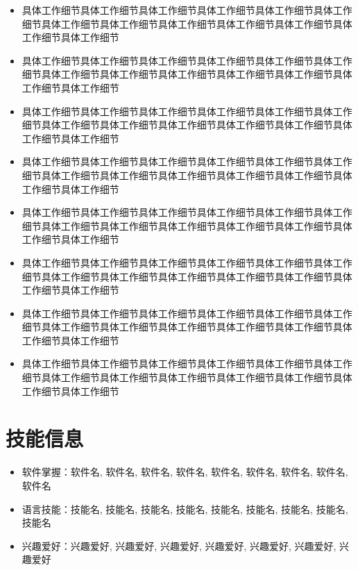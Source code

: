 \documentclass{my_cv} %
\begin{document}
\vspace{-5pt}
\begin{itemize}
  \item 具体工作细节具体工作细节具体工作细节具体工作细节具体工作细节具体工作细节具体工作细节具体工作细节具体工作细节具体工作细节具体工作细节具体工作细节具体工作细节
  \item 具体工作细节具体工作细节具体工作细节具体工作细节具体工作细节具体工作细节具体工作细节具体工作细节具体工作细节具体工作细节具体工作细节具体工作细节具体工作细节
  \item 具体工作细节具体工作细节具体工作细节具体工作细节具体工作细节具体工作细节具体工作细节具体工作细节具体工作细节具体工作细节具体工作细节具体工作细节具体工作细节
  \item 具体工作细节具体工作细节具体工作细节具体工作细节具体工作细节具体工作细节具体工作细节具体工作细节具体工作细节具体工作细节具体工作细节具体工作细节具体工作细节
\end{itemize}
\vspace{-10pt}

\vspace{-5pt}
\begin{itemize}
  \item 具体工作细节具体工作细节具体工作细节具体工作细节具体工作细节具体工作细节具体工作细节具体工作细节具体工作细节具体工作细节具体工作细节具体工作细节具体工作细节
  \item 具体工作细节具体工作细节具体工作细节具体工作细节具体工作细节具体工作细节具体工作细节具体工作细节具体工作细节具体工作细节具体工作细节具体工作细节具体工作细节
  \item 具体工作细节具体工作细节具体工作细节具体工作细节具体工作细节具体工作细节具体工作细节具体工作细节具体工作细节具体工作细节具体工作细节具体工作细节具体工作细节
  \item 具体工作细节具体工作细节具体工作细节具体工作细节具体工作细节具体工作细节具体工作细节具体工作细节具体工作细节具体工作细节具体工作细节具体工作细节具体工作细节
\end{itemize}

\section{技能信息}
\begin{itemize}
  \item 软件掌握：软件名, 软件名, 软件名, 软件名, 软件名, 软件名, 软件名, 软件名, 软件名
  \item 语言技能：技能名, 技能名, 技能名, 技能名, 技能名, 技能名, 技能名, 技能名, 技能名
  \item 兴趣爱好：兴趣爱好, 兴趣爱好, 兴趣爱好, 兴趣爱好, 兴趣爱好, 兴趣爱好, 兴趣爱好
\end{itemize}


\pagestyle{empty}  %
\thispagestyle{empty} %
\end{document}
